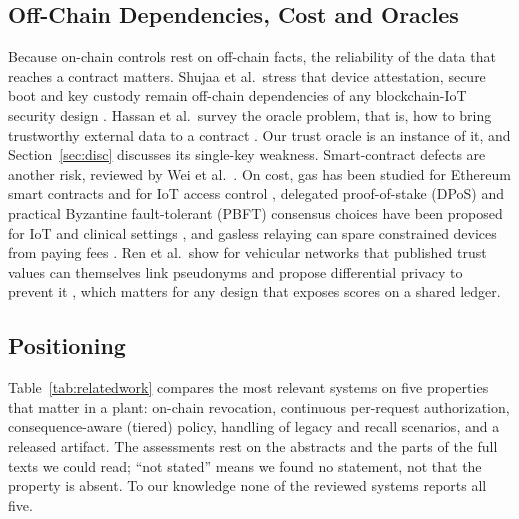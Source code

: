 \subsection{Off-Chain Dependencies, Cost and Oracles}
Because on-chain controls rest on off-chain facts, the reliability of the data that reaches a contract matters. Shujaa et al.\ stress that device attestation, secure boot and key custody remain off-chain dependencies of any blockchain-IoT security design \cite{shujaa2025enhancing}. Hassan et al.\ survey the oracle problem, that is, how to bring trustworthy external data to a contract \cite{hassan2023oracle}. Our trust oracle is an instance of it, and Section~\ref{sec:disc} discusses its single-key weakness. Smart-contract defects are another risk, reviewed by Wei et al.\ \cite{wei2024quality}. On cost, gas has been studied for Ethereum smart contracts \cite{ta2024gascost} and for IoT access control \cite{hasan2023smartcontract}, delegated proof-of-stake (DPoS) and practical Byzantine fault-tolerant (PBFT) consensus choices have been proposed for IoT and clinical settings \cite{haque2024scalable,peepliwal2024ztab}, and gasless relaying can spare constrained devices from paying fees \cite{madhwal2025gasless}. Ren et al.\ show for vehicular networks that published trust values can themselves link pseudonyms and propose differential privacy to prevent it \cite{ren2026ditdp}, which matters for any design that exposes scores on a shared ledger.

\subsection{Positioning}
Table~\ref{tab:relatedwork} compares the most relevant systems on five properties that matter in a plant: on-chain revocation, continuous per-request authorization, consequence-aware (tiered) policy, handling of legacy and recall scenarios, and a released artifact. The assessments rest on the abstracts and the parts of the full texts we could read; ``not stated'' means we found no statement, not that the property is absent. To our knowledge none of the reviewed systems reports all five.


